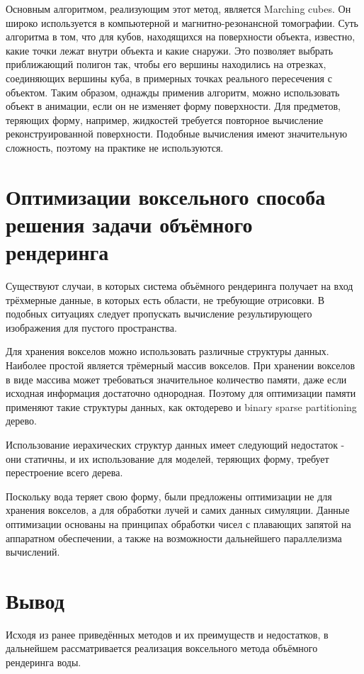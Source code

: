 Основным алгоритмом, реализующим этот метод, является Marching cubes.
Он широко используется в компьютерной и магнитно-резонансной томографии\cite{site:marchingcubes}.
Суть алгоритма в том, что для кубов, находящихся на поверхности объекта, известно,
какие точки лежат внутри объекта и какие снаружи. Это позволяет выбрать
приближающий полигон так, чтобы его вершины находились на отрезках, соединяющих вершины куба,
в примерных точках реального пересечения с объектом.
Таким образом, однажды применив алгоритм, можно использовать объект в анимации, если
он не изменяет форму поверхности.
Для предметов, теряющих форму, например, жидкостей требуется повторное вычисление
реконструированной поверхности. Подобные вычисления имеют значительную сложность,
поэтому на практике не используются\cite{book:ash}.


\section{Оптимизации воксельного способа решения задачи объёмного рендеринга}

Существуют случаи, в которых система объёмного рендеринга получает на вход трёхмерные данные, в
 которых есть области, не требующие отрисовки. В подобных ситуациях следует пропускать вычисление
 результирующего изображения для пустого пространства\cite{article:asvo}.

Для хранения вокселов можно использовать различные структуры данных. Наиболее простой является
трёмерный массив вокселов. При хранении вокселов в виде массива может требоваться значительное
количество памяти, даже если исходная информация достаточно однородная.
Поэтому для оптимизации памяти применяют такие структуры данных, как октодерево и binary sparse
partitioning дерево\cite{article:asvo}.

Использование иерахических структур данных имеет следующий недостаток - они статичны, и их
использование для моделей, теряющих форму, требует перестроение всего дерева\cite{article:asvo}.

Поскольку вода теряет свою форму, были предложены оптимизации не для хранения вокселов, а для
обработки лучей и самих данных симуляции. Данные оптимизации основаны на принципах обработки
чисел с плавающих запятой на аппаратном обеспечении, а также на возможности дальнейшего
параллелизма вычислений\cite{book:ash}.

\section{Вывод}

Исходя из ранее приведённых методов и их преимуществ и недостатков, в дальнейшем
рассматривается реализация воксельного метода объёмного рендеринга воды.

